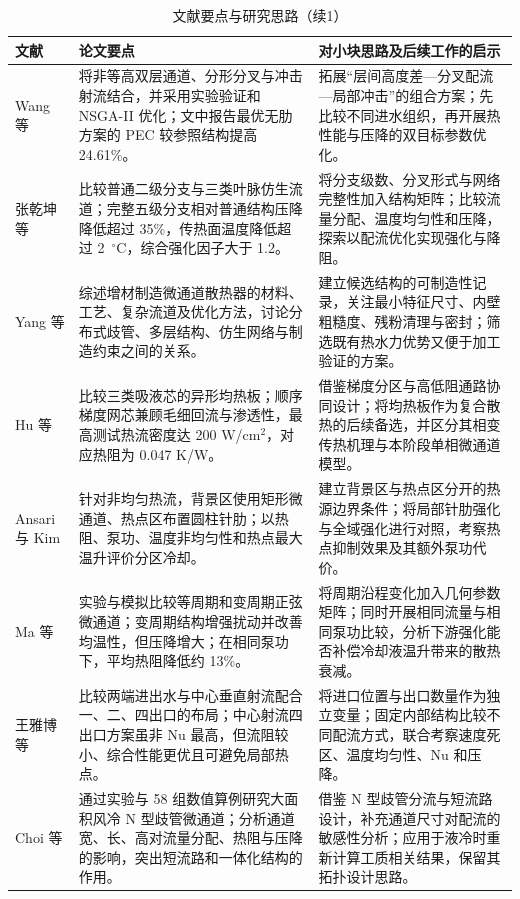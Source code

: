 \documentclass[stage1,fontset=fandol]{ydzjreport}
\begin{document}
	\begin{table}[H]
	  \centering
	  \small
	  \renewcommand{\arraystretch}{1.12}
	  \caption{文献要点与研究思路（续1）}
	  \label{tab:notes-cont-2}
	  \begin{tabularx}{\textwidth}{@{}>{\RaggedRight\arraybackslash}p{} Y Y@{}}
	    \toprule
{} 文献 & 论文要点 & 对小块思路及后续工作的启示 \\
	    \midrule
	    Wang 等\cite{ref5} & 将非等高双层通道、分形分叉与冲击射流结合，并采用实验验证和 NSGA-II 优化；文中报告最优无肋方案的 PEC 较参照结构提高 24.61\%。 & 拓展“层间高度差—分叉配流—局部冲击”的组合方案；先比较不同进水组织，再开展热性能与压降的双目标参数优化。 \\[3pt]
	    张乾坤等\cite{ref6} & 比较普通二级分支与三类叶脉仿生流道；完整五级分支相对普通结构压降降低超过 35\%，传热面温度降低超过 2 $\,{}^\circ\mathrm{C}$，综合强化因子大于 1.2。 & 将分支级数、分叉形式与网络完整性加入结构矩阵；比较流量分配、温度均匀性和压降，探索以配流优化实现强化与降阻。 \\[3pt]
	    Yang 等\cite{ref7} & 综述增材制造微通道散热器的材料、工艺、复杂流道及优化方法，讨论分布式歧管、多层结构、仿生网络与制造约束之间的关系。 & 建立候选结构的可制造性记录，关注最小特征尺寸、内壁粗糙度、残粉清理与密封；筛选既有热水力优势又便于加工验证的方案。 \\[3pt]
	    Hu 等\cite{ref8} & 比较三类吸液芯的异形均热板；顺序梯度网芯兼顾毛细回流与渗透性，最高测试热流密度达 200 W/cm$^2$，对应热阻为 0.047 K/W。 & 借鉴梯度分区与高低阻通路协同设计；将均热板作为复合散热的后续备选，并区分其相变传热机理与本阶段单相微通道模型。 \\[3pt]


	    Ansari 与 Kim\cite{ref13} & 针对非均匀热流，背景区使用矩形微通道、热点区布置圆柱针肋；以热阻、泵功、温度非均匀性和热点最大温升评价分区冷却。 & 建立背景区与热点区分开的热源边界条件；将局部针肋强化与全域强化进行对照，考察热点抑制效果及其额外泵功代价。 \\[3pt]

	    Ma 等\cite{ref15} & 实验与模拟比较等周期和变周期正弦微通道；变周期结构增强扰动并改善均温性，但压降增大；在相同泵功下，平均热阻降低约 13\%。 & 将周期沿程变化加入几何参数矩阵；同时开展相同流量与相同泵功比较，分析下游强化能否补偿冷却液温升带来的散热衰减。 \\[3pt]

	    王雅博等\cite{ref16} & 比较两端进出水与中心垂直射流配合一、二、四出口的布局；中心射流四出口方案虽非 Nu 最高，但流阻较小、综合性能更优且可避免局部热点。 & 将进口位置与出口数量作为独立变量；固定内部结构比较不同配流方式，联合考察速度死区、温度均匀性、Nu 和压降。 \\[3pt]

	    Choi 等\cite{ref17} & 通过实验与 58 组数值算例研究大面积风冷 N 型歧管微通道；分析通道宽、长、高对流量分配、热阻与压降的影响，突出短流路和一体化结构的作用。 & 借鉴 N 型歧管分流与短流路设计，补充通道尺寸对配流的敏感性分析；应用于液冷时重新计算工质相关结果，保留其拓扑设计思路。 \\[3pt]
	    \bottomrule
	  \end{tabularx}
	\end{table}
\end{document}
